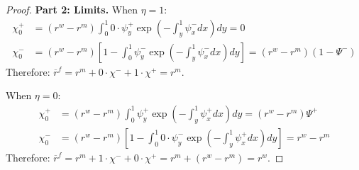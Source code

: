 \begin{proof}
\textbf{Part 2: Limits.} When $\eta = 1$:
\begin{align*}
\chi_{0}^{+} &= (r^{w} - r^{m})\int_{0}^{1}0 \cdot \psi_{y}^{+}\exp\left(-\int_{y}^{1}\psi_{x}^{-}dx\right)dy = 0\\
\chi_{0}^{-} &= (r^{w} - r^{m})\left[1 - \int_{0}^{1}\psi_{y}^{-}\exp\left(-\int_{y}^{1}\psi_{x}^{-}dx\right)dy\right] = (r^{w} - r^{m})(1 - \Psi^{-})
\end{align*}
Therefore: $\overline{r}^{f} = r^{m} + 0 \cdot \chi^{-} + 1 \cdot \chi^{+} = r^{m}$.

When $\eta = 0$:
\begin{align*}
\chi_{0}^{+} &= (r^{w} - r^{m})\int_{0}^{1}\psi_{y}^{+}\exp\left(-\int_{y}^{1}\psi_{x}^{+}dx\right)dy = (r^{w} - r^{m})\Psi^{+}\\
\chi_{0}^{-} &= (r^{w} - r^{m})\left[1 - \int_{0}^{1}0 \cdot \psi_{y}^{-}\exp\left(-\int_{y}^{1}\psi_{x}^{+}dx\right)dy\right] = r^{w} - r^{m}
\end{align*}
Therefore: $\overline{r}^{f} = r^{m} + 1 \cdot \chi^{-} + 0 \cdot \chi^{+} = r^{m} + (r^{w} - r^{m}) = r^{w}$.
\end{proof}